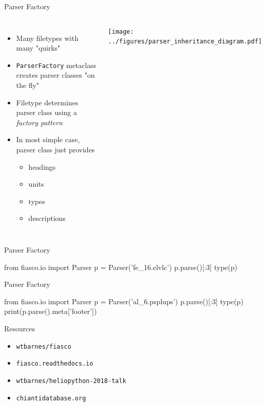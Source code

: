 \documentclass[12pt,aspectratio=169]{beamer}
\begin{document}
\begin{frame}{Parser Factory}
    \begin{columns}
            \begin{itemize}
                \item Many filetypes with many "quirks"
                \item \texttt{ParserFactory} metaclass creates parser classes "on the fly"
                \item Filetype determines parser class using a \textit{factory pattern}
                \item In most simple case, parser class just provides
                \begin{itemize}
                    \item headings
                    \item units
                    \item types
                    \item descriptions
                \end{itemize}
            \end{itemize}
            \texttt{[image: ../figures/parser\_inheritance\_diagram.pdf]}
    \end{columns}
\end{frame}
\begin{frame}[fragile]{Parser Factory}
\footnotesize
\begin{pyconsole}
from fiasco.io import Parser
p = Parser('fe_16.elvlc')
p.parse()[:3]
type(p)
\end{pyconsole}
\end{frame}
\begin{frame}[fragile]{Parser Factory}
\scriptsize
\begin{pyconsole}
from fiasco.io import Parser
p = Parser('al_6.psplups')
p.parse()[:3]
type(p)
print(p.parse().meta['footer'])
\end{pyconsole}
\end{frame}
\begin{frame}{Resources}
    \begin{itemize}
        \large
        \item[] \texttt{wtbarnes/fiasco}
        \item[] \texttt{fiasco.readthedocs.io}
        \item[] \texttt{wtbarnes/heliopython-2018-talk}
        \item[] \texttt{chiantidatabase.org}   
    \end{itemize}
\end{frame}
\end{document}
